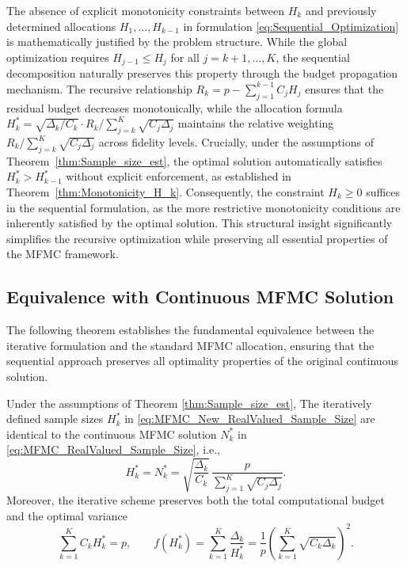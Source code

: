 %



The absence of explicit monotonicity constraints between $H_k$ and previously determined allocations $H_1, \ldots, H_{k-1}$ in formulation \eqref{eq:Sequential_Optimization} is mathematically justified by the problem structure. While the global optimization requires $H_{j-1} \le H_j$ for all $j=k+1,\ldots,K$, the sequential decomposition naturally preserves this property through the budget propagation mechanism. The recursive relationship $R_k = p - \sum_{j=1}^{k-1} C_j H_j$ ensures that the residual budget decreases monotonically, while the allocation formula $H_k^* = \sqrt{\Delta_k/C_k} \cdot R_k / \sum_{j=k}^K \sqrt{C_j\Delta_j}$ maintains the relative weighting $R_k / \sum_{j=k}^K \sqrt{C_j\Delta_j}$ across fidelity levels. Crucially, under the assumptions of Theorem~\ref{thm:Sample_size_est}, the optimal solution automatically satisfies $H_k^* > H_{k-1}^*$ without explicit enforcement, as established in Theorem~\ref{thm:Monotonicity_H_k}. Consequently, the constraint $H_k \ge 0$ suffices in the sequential formulation, as the more restrictive monotonicity conditions are inherently satisfied by the optimal solution. This structural insight significantly simplifies the recursive optimization while preserving all essential properties of the MFMC framework.

\subsection{Equivalence with Continuous MFMC Solution}

The following theorem establishes the fundamental equivalence between the iterative formulation and the standard MFMC allocation, ensuring that the sequential approach preserves all optimality properties of the original continuous solution.

%
\begin{theorem}\label{thm:MFMC_Iterative_RealValued_Sample_Size}
Under the assumptions of Theorem \ref{thm:Sample_size_est},
The iteratively defined sample sizes $H_k^*$ in \eqref{eq:MFMC_New_RealValued_Sample_Size} are identical to the continuous MFMC solution $N_k^*$ in \eqref{eq:MFMC_RealValued_Sample_Size}, i.e.,
\[
H_k^* = N_k^*
    = \sqrt{\frac{\Delta_k}{C_k}}\,
      \frac{p}{\sum_{j=1}^K \sqrt{C_j\Delta_j}}.
\]
Moreover, the iterative scheme preserves both the total computational budget and the optimal variance
\[
\sum_{k=1}^K C_k H_k^* = p, 
\qquad  
f(H_k^*) = \sum_{k=1}^K \frac{\Delta_k}{H_k^*} = \frac{1}{p} \left(\sum_{k=1}^K \sqrt{C_k\Delta_k}\right)^2.
\]
\end{theorem}
%


